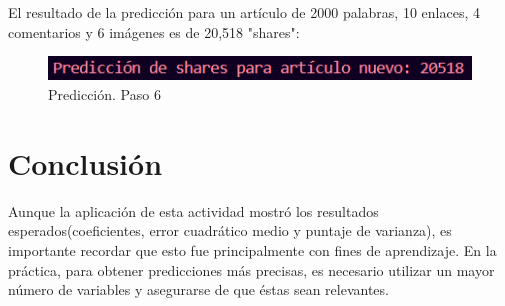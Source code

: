 \documentclass{article}
\begin{document}
El resultado de la predicción para un artículo de 2000 palabras, 10 enlaces, 4 comentarios y 6 imágenes es de 20,518 "shares":
\begin{figure}[H]
    \centering
    \includegraphics[width=0.7\linewidth]{img/a10_prediccion.png}
    \caption{Predicción. Paso 6}
    \label{fig:figure2}
\end{figure}

\section{Conclusión}
Aunque la aplicación de esta actividad mostró los resultados esperados(coeficientes, error cuadrático medio y puntaje de varianza), es importante recordar que esto fue principalmente con fines de aprendizaje. En la práctica, para obtener predicciones más precisas, es necesario utilizar un mayor número de variables y asegurarse de que éstas sean relevantes.
\end{document}
